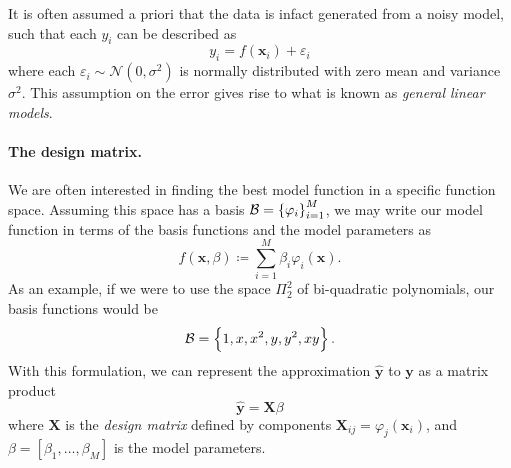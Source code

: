 \documentclass[dvipsnames, article, a4paper, oneside, 12pt]{memoir}
\newcommand{\x}{\bm{x}}
\newcommand{\X}{\bm{X}}
\newcommand{\y}{\bm{y}}
\newcommand{\N}{\mathcal{N}}
\newcommand{\basis}{\mathcal{B}}
\begin{document}
  \begin{assumption}
    \label{as:general_linear}
    It is often assumed a priori that the data is infact generated from a noisy
    model, such that each \( y_i \) can be described as
    \begin{equation}
      y_i = f(\x_i) + \varepsilon_i
    \end{equation}
    where each \( \varepsilon_i \sim \N(0, \sigma^2) \) is normally distributed
    with zero mean and variance \( \sigma^2 \). This assumption on the error
    gives rise to what is known as \emph{general linear models}.
  \end{assumption}


  \paragraph{The design matrix.} We are often interested in finding the best
  model function in a specific function space.  Assuming this space has a basis
  \( \basis = \set{\varphi_i}_{i=1}^M\), we may write our model function in
  terms of the basis functions and the model parameters as
  \begin{equation}
    \label{eq:gen_lin_mod}
    f(\x, \beta) \coloneqq \sum_{i = 1}^M \beta_i\varphi_i(\x).
  \end{equation}
  As an example, if we were to use the space \( \Pi_2^2 \) of bi-quadratic
  polynomials, our basis functions would be
  \begin{equation}
    \basis = \set{1, x, x^2, y, y^2, xy}.
  \end{equation}
  With this formulation, we can represent the approximation \( \hat{\y} \) to
  \( \y \) as a matrix product 
  \begin{equation}
    \label{eq:matrix_prod}
    \hat{\y} = \X\beta
  \end{equation}
  where \( \X \) is the \emph{design matrix} defined by components \(\X_{ij} =
  \varphi_j(\x_i)\), and \( \beta = [\beta_1, \ldots, \beta_M] \) is the model
  parameters. 
\end{document}
